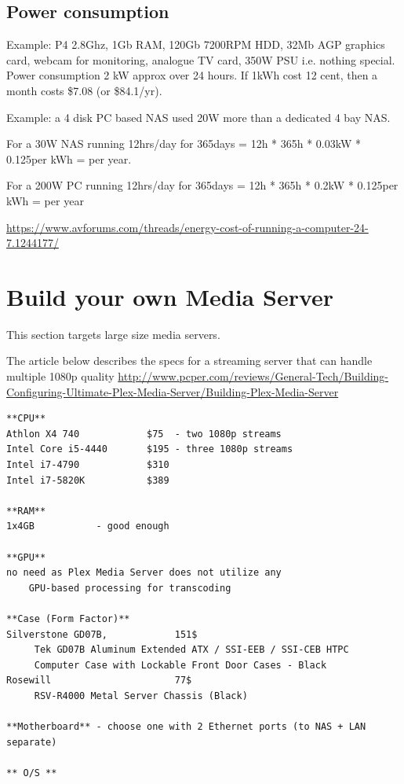 \subsection{Power consumption}

Example: P4 2.8Ghz, 1Gb RAM, 120Gb 7200RPM HDD, 32Mb AGP graphics card, webcam
for monitoring, analogue TV card, 350W PSU i.e. nothing special. Power
consumption 2 kW approx over 24 hours.
If 1kWh cost 12 cent, then a month costs \$7.08 (or \$84.1/yr).

Example: a 4 disk PC based NAS used 20W more than a dedicated 4 bay NAS.


For a 30W NAS running 12hrs/day for 365days = 12h * 365h * 0.03kW *
\textsterling 0.125per kWh =  per year.


For a 200W PC running 12hrs/day for 365days 
= 12h * 365h * 0.2kW * \textsterling 0.125per kWh =  per year

\url{https://www.avforums.com/threads/energy-cost-of-running-a-computer-24-7.1244177/}




\section{Build your own Media Server}

This section targets large size media servers.

The article below describes the specs for a streaming server that can handle
multiple 1080p quality
\url{http://www.pcper.com/reviews/General-Tech/Building-Configuring-Ultimate-Plex-Media-Server/Building-Plex-Media-Server}
\begin{verbatim}
**CPU**
Athlon X4 740            $75  - two 1080p streams
Intel Core i5-4440       $195 - three 1080p streams
Intel i7-4790            $310
Intel i7-5820K           $389

**RAM**
1x4GB           - good enough

**GPU**
no need as Plex Media Server does not utilize any 
    GPU-based processing for transcoding
    
**Case (Form Factor)**
Silverstone GD07B,            151$ 
     Tek GD07B Aluminum Extended ATX / SSI-EEB / SSI-CEB HTPC
     Computer Case with Lockable Front Door Cases - Black
Rosewill                      77$
     RSV-R4000 Metal Server Chassis (Black)    

**Motherboard** - choose one with 2 Ethernet ports (to NAS + LAN separate)

** O/S ** 
 
     
\end{verbatim}

